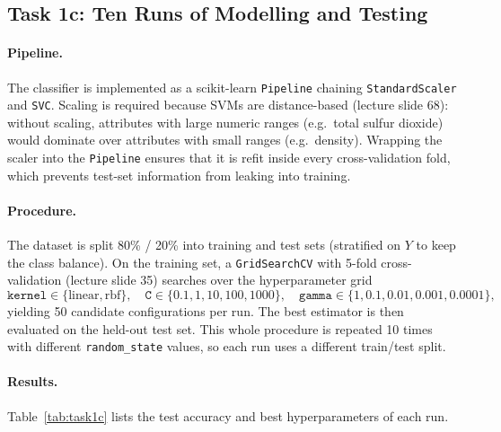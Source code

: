 \subsection{Task 1c: Ten Runs of Modelling and Testing}

\paragraph{Pipeline.}
The classifier is implemented as a scikit-learn \texttt{Pipeline} chaining
\texttt{StandardScaler} and \texttt{SVC}. Scaling is required because
SVMs are distance-based (lecture slide 68): without scaling, attributes
with large numeric ranges (e.g.\ total sulfur dioxide) would dominate
over attributes with small ranges (e.g.\ density). Wrapping the scaler
into the \texttt{Pipeline} ensures that it is refit inside every
cross-validation fold, which prevents test-set information from leaking
into training.

\paragraph{Procedure.}
The dataset is split 80\% / 20\% into training and test sets (stratified
on $Y$ to keep the class balance). On the training set, a
\texttt{GridSearchCV} with 5-fold cross-validation (lecture slide 35)
searches over the hyperparameter grid
\[
    \texttt{kernel} \in \{\text{linear}, \text{rbf}\}, \quad
    \texttt{C} \in \{0.1, 1, 10, 100, 1000\}, \quad
    \texttt{gamma} \in \{1, 0.1, 0.01, 0.001, 0.0001\},
\]
yielding 50 candidate configurations per run. The best estimator is
then evaluated on the held-out test set. This whole procedure is
repeated 10 times with different \texttt{random\_state} values, so each
run uses a different train/test split.

\paragraph{Results.}
Table~\ref{tab:task1c} lists the test accuracy and best hyperparameters
of each run.

